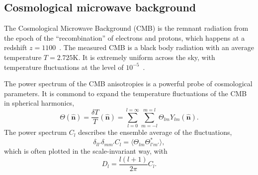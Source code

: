 \documentclass[doublespace,nopageskip]{VTthesis} %
\begin{document}
\subsection{Cosmological microwave background}

The Cosmological Microwave Background (CMB) is the remnant radiation from the epoch of the ``recombination'' of electrons and protons, which happens at a redshift $z = 1100$~\cite{2003moco.book.....D}. The measured CMB is a black body radiation with an average temperature $T = 2.725$K. It is extremely uniform across the sky, with temperature fluctuations at the level of $10^{-5}$~\cite{2002ARA&A..40..171H}. 

The power spectrum of the CMB anisotropies is a powerful probe of cosmological parameters.
It is commond to expand the temperature fluctuations of the CMB in spherical harmonics,
\begin{equation}
    \Theta(\hat{\bm n}) = \frac{\delta T}{T}(\hat{\bm n}) = \sum^{l=\infty}_{l=0}\sum^{m=l}_{m=-l} \Theta_{lm}Y_{lm}(\hat{\bm n}).
\end{equation}
The power spectrum $C_l$ describes the ensemble average of the fluctuations,
\begin{equation}
    \delta_{ll'}\delta_{mm'}C_l = \langle\Theta_{lm}\Theta^*_{l'm'}\rangle,
\end{equation}
which is often plotted in the scale-invariant way, with
\begin{equation}
    D_l = \frac{l(l+1)}{2\pi}C_l.
\end{equation}
\end{document}
